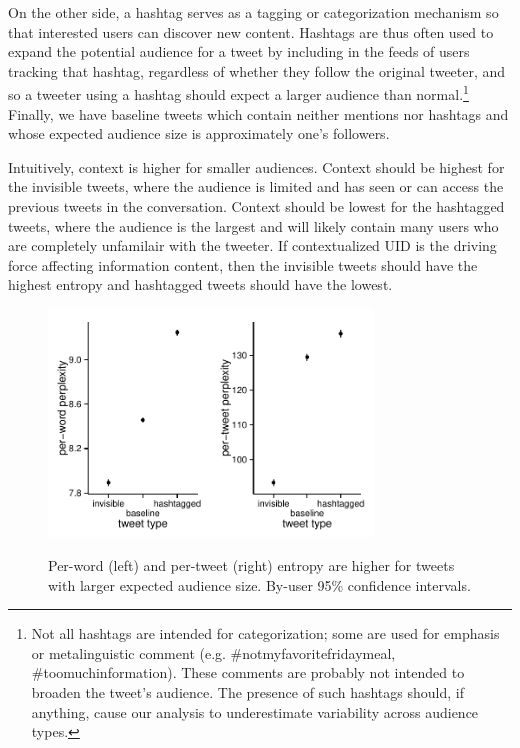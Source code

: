 \documentclass[11pt,letterpaper]{article}
\begin{document}
On the other side, a hashtag serves as a tagging or categorization mechanism so that interested users can discover new content. Hashtags are thus often used to expand the potential audience for a tweet by including in the feeds of users tracking that hashtag, regardless of whether they follow the original tweeter, and so a tweeter using a hashtag should expect a larger audience than normal.\footnote{Not all hashtags are intended for categorization; some are used for emphasis or metalinguistic comment (e.g. \#notmyfavoritefridaymeal, \#toomuchinformation). These comments are probably not intended to broaden the tweet's audience. The presence of such hashtags should, if anything, cause our analysis to underestimate variability across audience types.}  Finally, we have baseline tweets which contain neither mentions nor hashtags and whose expected audience size is approximately one's followers.

Intuitively, context is higher for smaller audiences. Context should be highest for the invisible tweets, where the audience is limited and has seen or can access the previous tweets in the conversation.  Context should be lowest for the hashtagged tweets, where the audience is the largest and will likely contain many users who are completely unfamilair with the tweeter.  If contextualized UID is the driving force affecting information content, then the invisible tweets should have the highest entropy and hashtagged tweets should have the lowest.

\begin{figure}
 \centering \includegraphics[width=1.7in]{figures/cmcl-audience-pw.pdf}\includegraphics[width=1.7in]{figures/cmcl-audience-pt.pdf}
 \caption{\label{fig:audience} Per-word (left) and per-tweet (right) entropy are higher for tweets with larger expected audience size. By-user 95\% confidence intervals.}
\vspace*{-.5em}
\end{figure}
\end{document}
